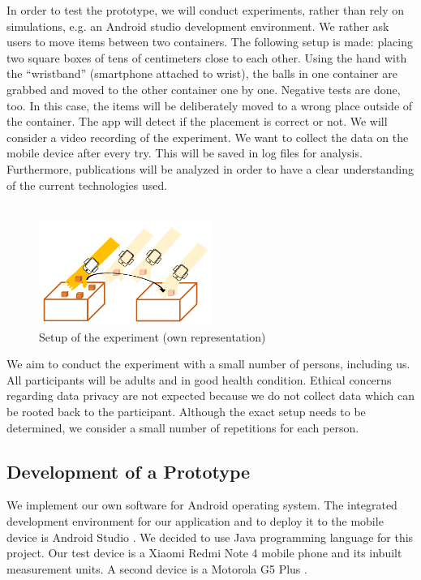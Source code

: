 \documentclass[12pt,twoside, hidelinks]{article}
\begin{document}
In order to test the prototype, we will conduct experiments, rather than rely on simulations, e.g. an Android studio development environment. We rather ask users to move items between two containers. The following setup is made: placing two square boxes of tens of centimeters close to each other. Using the hand with the “wristband” (smartphone attached to wrist), the balls in one container are grabbed and moved to the other container one by one. Negative tests are done, too. In this case, the items will be deliberately moved to a wrong place outside of the container. The app will detect if the placement is correct or not. We will consider a video recording of the experiment. We want to collect the data on the mobile device after every try. This will be saved in log files for analysis.
Furthermore, publications will be analyzed in order to have a clear understanding of the current technologies used.
\\
\\

\begin{figure}[!]
	\begin{center}
		\includegraphics[width=0.5\textwidth]{figures/experiment_setup}
		\caption{Setup of the experiment (own representation)}
		\label{fig:experiment}
	\end{center}
\end{figure}

We aim to conduct the experiment with a small number of persons, including us. All participants will be adults and in good health condition. Ethical concerns regarding data privacy are not expected because we do not collect data which can be rooted back to the participant. Although the exact setup needs to be determined, we consider a small number of repetitions for each person.

\subsection{Development of a Prototype}
\label{sect:implementation}
We implement our own software for Android operating system\cite{Android}. The integrated development environment for our application and to deploy it to the mobile device is Android Studio \cite{Android_Studio} . We decided to use Java programming language \cite{Java} for this project. Our test device is a Xiaomi Redmi Note 4 mobile phone \cite{Redmi_Note4} and its inbuilt measurement units. A second device is a Motorola G5 Plus \cite{motoG5}.
\end{document}
